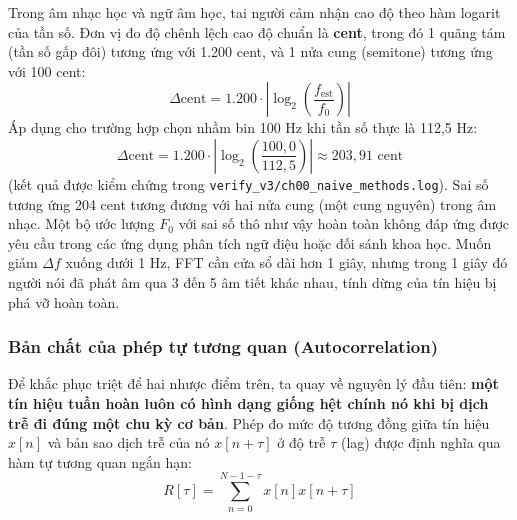 Trong âm nhạc học và ngữ âm học, tai người cảm nhận cao độ theo hàm logarit của tần số. Đơn vị đo độ chênh lệch cao độ chuẩn là \textbf{cent}, trong đó 1 quãng tám (tần số gấp đôi) tương ứng với 1.200 cent, và 1 nửa cung (semitone) tương ứng với 100 cent:
\begin{equation}
\Delta \text{cent} = 1.200 \cdot \left| \log_2 \left( \frac{f_{\text{est}}}{f_0} \right) \right|
\end{equation}
Áp dụng cho trường hợp chọn nhầm bin 100 Hz khi tần số thực là 112,5 Hz:
\begin{equation}
\Delta \text{cent} = 1.200 \cdot \left| \log_2 \left( \frac{100{,}0}{112{,}5} \right) \right| \approx 203{,}91\text{ cent}
\end{equation}
(kết quả được kiểm chứng trong \texttt{verify\_v3/ch00\_naive\_methods.log}). Sai số tương ứng 204 cent tương đương với hai nửa cung (một cung nguyên) trong âm nhạc. Một bộ ước lượng $F_0$ với sai số thô như vậy hoàn toàn không đáp ứng được yêu cầu trong các ứng dụng phân tích ngữ điệu hoặc đối sánh khoa học. Muốn giảm $\Delta f$ xuống dưới 1 Hz, FFT cần cửa sổ dài hơn 1 giây, nhưng trong 1 giây đó người nói đã phát âm qua 3 đến 5 âm tiết khác nhau, tính dừng của tín hiệu bị phá vỡ hoàn toàn.

\subsubsection*{Bản chất của phép tự tương quan (Autocorrelation)}
Để khắc phục triệt để hai nhược điểm trên, ta quay về nguyên lý đầu tiên: \textbf{một tín hiệu tuần hoàn luôn có hình dạng giống hệt chính nó khi bị dịch trễ đi đúng một chu kỳ cơ bản}. Phép đo mức độ tương đồng giữa tín hiệu $x[n]$ và bản sao dịch trễ của nó $x[n+\tau]$ ở độ trễ $\tau$ (lag) được định nghĩa qua hàm tự tương quan ngắn hạn:
\begin{equation}
R[\tau] = \sum_{n=0}^{N-1-\tau} x[n] x[n+\tau]
\end{equation}

